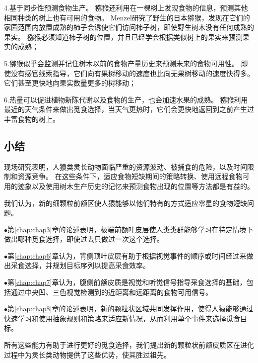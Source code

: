 4.基于同步性预测食物生产。
猕猴还利用在一棵树上发现食物的信息，预测其他相同种类的树上也有可用的食物。
Menzel\cite{menzel1991cognitive}研究了野生的日本猕猴，发现在它们的家园范围内放置成熟的柿子会诱使它们访问柿子树，即使野生树木没有任何成熟的果实。
猕猴必须知道柿子树的位置，并且已经学会根据类似树上的果实来预测果实的成熟；\par


5.猕猴似乎会监测并记住树木以前的食物产量历史来预测未来的食物可用性\cite{milton1988foraging}。
即使没有感官线索指导，它们向有果树移动的速度也比向无果树移动的速度快得多。它们甚至更快地向果实数量更多的树移动\cite{zuberbuhler2010foraging}；\par


6.热量可以促进植物新陈代谢以及食物的生产，也会加速水果的成熟。
猕猴利用最近的天气条件来做出觅食选择，当天气更热时，它们会更快地返回到之前产生过丰富食物的树上\cite{janmaat2006primates}。



\subsection{小结}
现场研究表明，人猿类灵长动物面临严重的资源波动、被捕食的危险，以及时间限制和资源竞争。
在这些条件下，适应食物短缺期间的策略转换、使用远程食物可用的迹象以及使用树木生产历史的记忆来预测食物出现的位置等方法都是有益的。


我们认为，新的细颗粒前额区使人猿能够以他们特有的方式适应零星的食物短缺问题。\par

$\bullet$第\ref{chap:chap3}章的论述表明，极端前额叶皮层使人类类群能够学习在特定情境下做出哪种觅食选择，即使过去只做过一次这个选择。\par

$\bullet$第\ref{chap:chap6}章认为，背侧顶叶皮层有助于根据视觉事件的顺序或时间经过来做出采食选择，并规划目标序列以提高采食效率。\par

$\bullet$第\ref{chap:chap7}章认为，腹侧前额皮质是视觉和听觉信号指导采食选择的基础，包括通过中央凹、三色视觉检测到的近距离和远距离的食物可用信号。\par

$\bullet$第\ref{chap:chap8}章的论述表明，新的颗粒状区域共同发挥作用，使得人猿能够通过快速学习和使用抽象规则和策略来适应新情况，从而利用单个事件来选择觅食目标。


所有这些能力有助于进行更好的觅食选择，我们提出新的颗粒状前额皮质区在进化过程中为灵长类动物提供了这些优势，使其胜过祖先。


